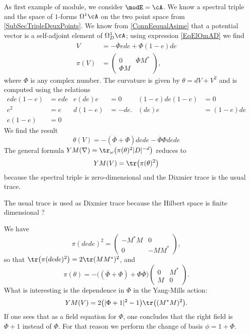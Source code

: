 As first example of module, we consider $\modE=\cA$. We know a spectral triple and the space of $1$-forms $\Omega^1\cA$ on the two point space from \ref{SubSecTripleDeuxPoints}. We know from \ref{ConnEequalAsime} that a potential vector is a self-adjoint element of $\Omega^1_D\cA$; using expression \ref{EqElOmAD} we find
\begin{align}
	V&=-\overline{ \Phi }ede+\Phi(1-e)de\\
	\pi(V)&=\begin{pmatrix}
0&\overline{ \Phi }M^*\\
\Phi M
\end{pmatrix},
\end{align}
where $\Phi$ is any complex number. The curvature is given by $\theta=dV+V^2$ and is computed using the relations
\begin{align*}
ede(1-e)&=ede		&e(de)e&=0	&(1-e)de(1-e)&=0\\
e^2&=e			&d(1-e)&=-de.	&(de)e&=(1-e)de\\
e(1-e)&=0		
\end{align*}
We find the result
\begin{equation}
\theta(V)=-(\overline{ \Phi }+\Phi)dede-\overline{ \Phi }\Phi dede
\end{equation}
The general formula $YM(\nabla)=\tr_{\omega}\big( \pi(\theta)^2| D |^{-d} \big)$ reduces to
\[ 
  YM(V)=\tr\big( \pi(\theta)^{2} \big)
\]
because the spectral triple is zero-dimensional and the Dixmier trace is the usual trace.

\begin{probleme}
	The usual trace is used as Dixmier trace because the Hilbert space is finite dimensional ?
\end{probleme}
We have
\[ 
  \pi(dede)^2=\begin{pmatrix}
-M^*M&0\\0&-MM^*
\end{pmatrix},
\]
so that $\tr\big( \pi(dede)^2 \big)=2\tr(MM^*)^2$, and
\[ 
  \pi(\theta)=-\big( (\overline{ \Phi }+\Phi)+\Phi\overline{ \Phi } \big)\begin{pmatrix}
0&M^*\\M&0
\end{pmatrix}.
\]
What is interesting is the dependence in $\Phi$ in the Yang-Mills action:
\begin{equation}
YM(V)=2\big( | \Phi+1 |^2-1 \big)\tr\big( (M^*M)^2 \big).
\end{equation}
If one sees that as a field equation for $\Phi$, one concludes that the right field is $\Phi+1$ instead of $\Phi$. For that reason we perform the change of basis $\phi=1+\Phi$.

